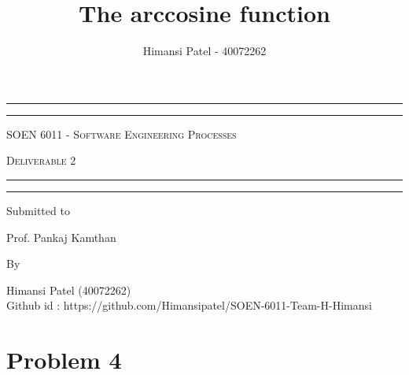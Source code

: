 \documentclass[a4paper,11pt]{report}
\title{The arccosine function}
\author{Himansi Patel - 40072262}
\begin{document}
\begin{titlepage}
	\centering 
	
	\vspace*{4\baselineskip} 
	
	\rule{\textwidth}{1.6pt}\vspace*{-\baselineskip}\vspace*{2pt} 
	\rule{\textwidth}{0.4pt} 
	
	\vspace{0.75\baselineskip} 
	
	{\scshape \LARGE SOEN 6011 - Software Engineering Processes\\}
	
	{\scshape \LARGE Deliverable 2\\} 
	
	\vspace{0.75\baselineskip}
	
	\rule{\textwidth}{0.4pt}\vspace*{-\baselineskip}\vspace{3.2pt} 
	\rule{\textwidth}{1.6pt}
	
	\vspace{2\baselineskip} 
	
	\vspace*{3\baselineskip} 

	{\Large Submitted to\\ } 
	
	\vspace{0.2\baselineskip} 
	
	{\Large Prof. Pankaj Kamthan \\} 
	
	
	\vspace*{3\baselineskip} 
	
	{\Large By\\ } 
	\vspace{0.2\baselineskip} 
	
	{\Large Himansi Patel (40072262)\\ } 
	{\large Github id : https://github.com/Himansipatel/SOEN-6011-Team-H-Himansi \\}
	


\end{titlepage}
\newpage
\tableofcontents
\newpage

\section{Problem 4}
\end{document}
